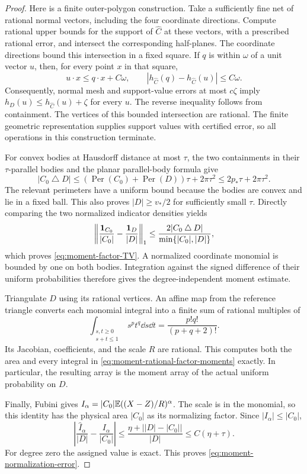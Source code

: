 \begin{proof}
Here is a finite outer-polygon construction.  Take a sufficiently
fine net of rational normal vectors, including the four coordinate
directions.  Compute rational upper bounds for the support of
$\widehat C$ at these vectors, with a prescribed rational error,
and intersect the corresponding half-planes.  The coordinate
directions bound this intersection in a fixed square.  If $q$ is
within $\omega$ of a unit vector $u$, then, for every point $x$ in
that square,
\[
 u\cdot x\le q\cdot x+C\omega,
 \qquad
 |h_{\widehat C}(q)-h_{\widehat C}(u)|\le C\omega.
\]
Consequently, normal mesh and support-value errors at most
$c\zeta$ imply $h_D(u)\le h_{\widehat C}(u)+\zeta$ for every $u$.
The reverse inequality follows from containment.  The vertices of
this bounded intersection are rational.  The finite geometric
representation supplies support values with certified error, so all
operations in this construction terminate.

For convex bodies at Hausdorff distance at most $\tau$, the two
containments in their $\tau$-parallel bodies and the planar
parallel-body formula give
\[
 |C_0\mathbin\triangle D|
       \le (\operatorname{Per}(C_0)+\operatorname{Per}(D))\tau
                    +2\pi\tau^2
       \le 2p_*\tau+2\pi\tau^2.
\]
The relevant perimeters have a uniform bound because the bodies
are convex and lie in a fixed ball.  This also proves
$|D|\ge v_*/2$ for sufficiently small $\tau$.  Directly comparing
the two normalized indicator densities yields
\[
 \left\|\frac{\mathbf 1_{C_0}}{|C_0|}
              -\frac{\mathbf 1_D}{|D|}\right\|_1
 \le \frac{2|C_0\mathbin\triangle D|}
                       {\min\{|C_0|,|D|\}},
\]
which proves \eqref{eq:moment-factor-TV}.  A normalized coordinate
monomial is bounded by one on both bodies.  Integration against the
signed difference of their uniform probabilities therefore gives
the degree-independent moment estimate.

Triangulate $D$ using its rational vertices.  An affine map from
the reference triangle converts each monomial integral into a finite
sum of rational multiples of
\[
 \int_{\substack{s,t\ge0\\s+t\le1}}s^p t^q\dd s\dd t
                       =\frac{p!q!}{(p+q+2)!}.
\]
Its Jacobian, coefficients, and the scale $R$ are rational.  This
computes both the area and every integral in
\eqref{eq:moment-rational-factor-moments} exactly.  In particular,
the resulting array is the moment array of the actual uniform
probability on $D$.

Finally, Fubini gives
$I_\alpha=|C_0|\mathbb E((X-Z)/R)^\alpha$.  The scale is in the
monomial, so this identity has the physical area $|C_0|$ as its
normalizing factor.  Since $|I_\alpha|\le|C_0|$,
\[
 \left|\frac{\widehat I_\alpha}{|D|}
                    -\frac{I_\alpha}{|C_0|}\right|
 \le \frac{\eta+\bigl||D|-|C_0|\bigr|}{|D|}
 \le C(\eta+\tau).
\]
For degree zero the assigned value is exact.  This proves
\eqref{eq:moment-normalization-error}.
\end{proof}

